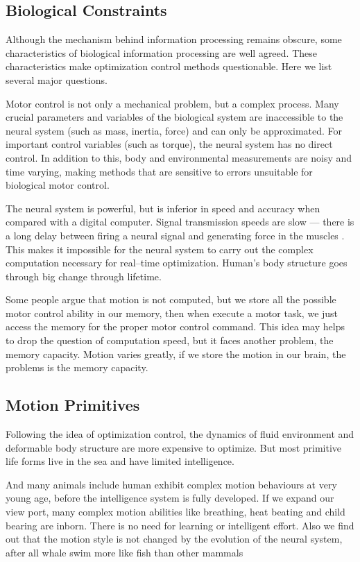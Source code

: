 \subsection{Biological Constraints}
Although the mechanism behind information processing remains obscure, some characteristics of biological information processing are well agreed.
These characteristics make optimization control methods questionable. 
Here we list several major questions\citep{Glynn2003}.  
\begin{itemize}
Motor control is not only a mechanical problem, but a complex process. 
Many crucial parameters and variables of the biological system are inaccessible to the neural system (such as mass, inertia, force) and can only be approximated. 
For important control variables (such as torque), the neural system has no direct control.
In addition to this, body and environmental measurements are noisy and time varying, making methods that are sensitive to errors unsuitable for biological motor control.

The neural system is powerful, but is inferior in speed and accuracy when compared with a digital computer. 
Signal transmission speeds are slow — there is a long delay between firing a neural signal and generating force in the muscles . 
This makes it impossible for the neural system to carry out the complex computation necessary for real–time optimization.
Human’s body structure goes through big change through lifetime.

Some people argue that motion is not computed, but we store all the possible motor control ability in our memory, then when execute a motor task, we just access the memory for the proper motor control command.
This idea may helps to drop the question of computation speed, but it faces another problem, the memory capacity. 
Motion varies greatly, if we store the motion in our brain, the problems is the memory capacity.
\end{itemize}

\subsection{Motion Primitives}
Following the idea of optimization control, the dynamics of fluid environment and deformable body structure are more expensive to optimize. 
But most primitive life forms live in the sea and have limited intelligence. 

And many animals include human exhibit complex motion behaviours at very young age, before the intelligence system is fully developed.
If we expand our view port, many complex motion abilities like breathing, heat beating and child bearing are inborn.
There is no need for learning or intelligent effort.
Also we find out that the motion style is not changed by the evolution of the neural system, after all whale swim more like fish than other mammals

